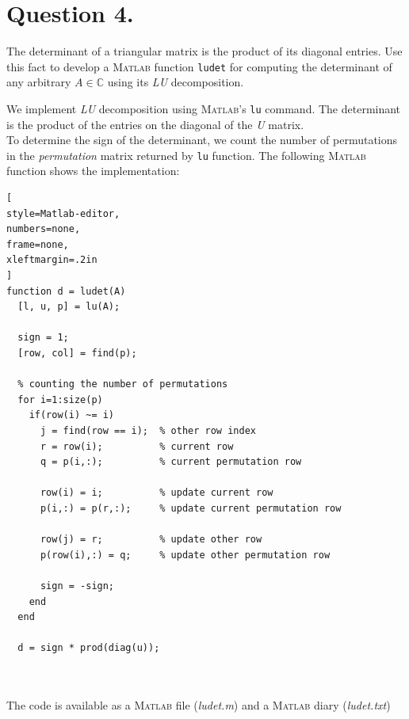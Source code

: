 \documentclass[a4paper,11pt]{article}
\begin{document}
\section*{Question 4.}
The determinant of a triangular matrix is the product of its diagonal entries. Use this fact to develop a \textsc{Matlab} function \texttt{ludet} for computing the determinant of any arbitrary $A \in \mathbb{C}$ using its \textit{LU} decomposition.
\begin{margin}{0.5cm}{0.5cm}
	We implement \textit{LU} decomposition using \textsc{Matlab}'s \texttt{lu} command. The determinant is the product of the entries on the diagonal of the \textit{U} matrix.\\
	To determine the sign of the determinant, we count the number of permutations in the \textit{permutation} matrix returned by \texttt{lu} function. The following \textsc{Matlab} function shows the implementation:
\begin{lstlisting}[
style=Matlab-editor,
numbers=none,
frame=none,
xleftmargin=.2in
]
function d = ludet(A)
  [l, u, p] = lu(A);

  sign = 1;
  [row, col] = find(p);

  % counting the number of permutations
  for i=1:size(p)
    if(row(i) ~= i)
      j = find(row == i);  % other row index
      r = row(i);          % current row
      q = p(i,:);          % current permutation row

      row(i) = i;          % update current row
      p(i,:) = p(r,:);     % update current permutation row

      row(j) = r;          % update other row
      p(row(i),:) = q;     % update other permutation row

      sign = -sign;
    end
  end

  d = sign * prod(diag(u));
\end{lstlisting}
\noindent
\\\\The code is available as a \textsc{Matlab} file (\textit{ludet.m}) and a \textsc{Matlab} diary (\textit{ludet.txt})
\end{margin}
\end{document}
